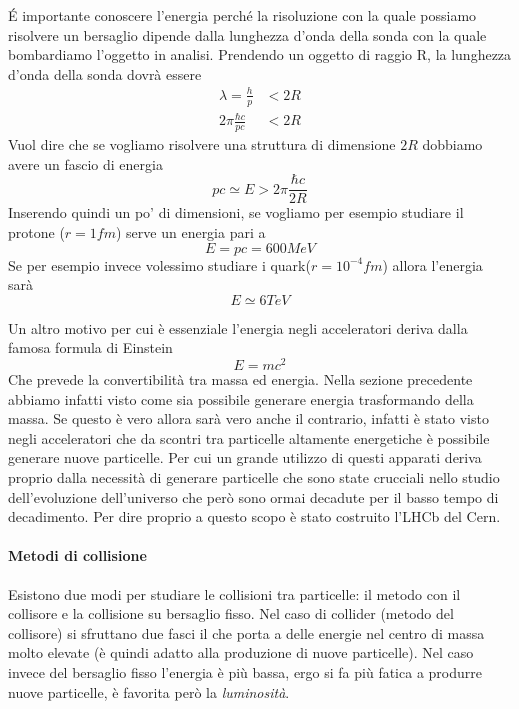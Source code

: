 \'E importante conoscere l'energia perché la risoluzione con la quale possiamo risolvere un bersaglio dipende dalla lunghezza d'onda della sonda con la quale bombardiamo l'oggetto in analisi.
Prendendo un oggetto di raggio R, la lunghezza d'onda della sonda dovrà essere
\begin{equation}
\begin{split}
\lambda=\frac{h}{p}&<2R\\
2\pi \frac{\hbar c}{pc}&<2R
\end{split}
\end{equation}
Vuol dire che se vogliamo risolvere una struttura di dimensione $2R$ dobbiamo avere un fascio di energia
\begin{equation}
pc\simeq E>2\pi\frac{\hbar c}{2R}
\end{equation}
Inserendo quindi un po' di dimensioni, se vogliamo per esempio studiare il protone ($r=1fm$) serve un energia pari a 
\begin{equation}
E=pc=600MeV
\end{equation}
Se per esempio invece volessimo studiare i quark($r=10^{-4}fm$) allora l'energia sarà
\begin{equation}
E\simeq 6TeV
\end{equation}

Un altro motivo per cui è essenziale l'energia negli acceleratori deriva dalla famosa formula di Einstein
\begin{equation}
E=mc^2
\end{equation}
Che prevede la convertibilità tra massa ed energia.
Nella sezione precedente abbiamo infatti visto come sia possibile generare energia trasformando della massa.
Se questo è vero allora sarà vero anche il contrario, infatti è stato visto negli acceleratori che da scontri tra particelle altamente energetiche è possibile generare nuove particelle.
Per cui un grande utilizzo di questi apparati deriva proprio dalla necessità di generare particelle che sono state crucciali nello studio dell'evoluzione dell'universo che però sono ormai decadute per il basso tempo di decadimento.
Per dire proprio a questo scopo è stato costruito l'LHCb del Cern.

\paragraph{Metodi di collisione}
Esistono due modi per studiare le collisioni tra particelle: il metodo con il collisore e la collisione su bersaglio fisso.
Nel caso di collider (metodo del collisore) si sfruttano due fasci il che porta a delle energie nel centro di massa molto elevate (è quindi adatto alla produzione di nuove particelle).
Nel caso invece del bersaglio fisso l'energia è più bassa, ergo si fa più fatica a produrre nuove particelle, è favorita però la \emph{luminosità}.

